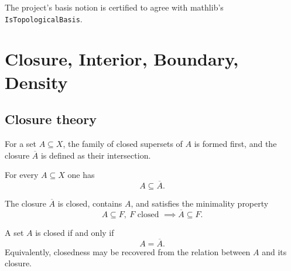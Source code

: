 \begin{remark}\label{rem:mathlib-basis-cert-3-16}
\leanok
The project's basis notion is certified to agree with mathlib's \texttt{IsTopologicalBasis}.
\end{remark}

\chapter{Closure, Interior, Boundary, Density}

\section{Closure theory}

\begin{definition}\label{def:closure-4-1}
\leanok
For a set $A\subseteq X$, the family of closed supersets of $A$ is formed first, and the closure $\overline A$ is defined as their intersection.
\end{definition}

\begin{proposition}\label{prop:subset-closure-4-1}
\leanok
For every $A\subseteq X$ one has
\[
A\subseteq\overline A.
\]
\end{proposition}

\begin{proposition}\label{prop:closure-closed-minimal-4-1-4-2}
\leanok
The closure $\overline A$ is closed, contains $A$, and satisfies the minimality property
\[
A\subseteq F,\ F\text{ closed } \implies \overline A\subseteq F.
\]
\end{proposition}

\begin{proposition}\label{prop:closed-iff-closure-4-3}
\leanok
A set $A$ is closed if and only if
\[
A=\overline A.
\]
Equivalently, closedness may be recovered from the relation between $A$ and its closure.
\end{proposition}

